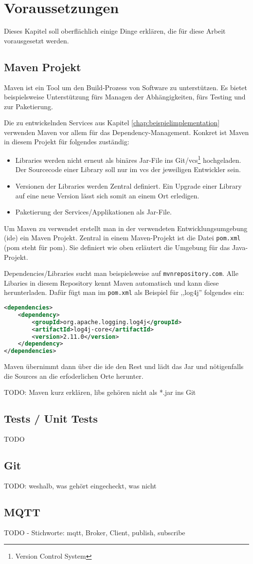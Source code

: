 \chapter{Voraussetzungen}
\label{chap:voraussetzungen}
Dieses Kapitel soll oberflächlich einige Dinge erklären, die für diese Arbeit vorausgesetzt werden.
\section{Maven Projekt}
\label{chap:maven}
Maven ist ein Tool um den Build-Prozess von Software zu unterstützen. Es bietet beispielsweise Unterstützung fürs Managen der Abhängigkeiten, fürs Testing und zur Paketierung.

Die zu entwickelnden Services aus Kapitel \ref{chap:beispielimplementation} verwenden Maven vor allem für das Dependency-Management. Konkret ist Maven in diesem Projekt für folgendes zuständig:
\begin{itemize}
	\item
	Libraries werden nicht erneut als binäres Jar-File ins Git/\acrshort{vcs}\footnote{Version Control System} hochgeladen. Der Sourcecode einer Library soll nur im \acrshort{vcs} der jeweiligen Entwickler sein.
	\item
	Versionen der Libraries werden Zentral definiert. Ein Upgrade einer Library auf eine neue Version lässt sich somit an einem Ort erledigen.
	\item
	Paketierung der Services/Applikationen als Jar-File.
\end{itemize}
Um Maven zu verwendet erstellt man in der verwendeten Entwicklungsumgebung (\acrshort{ide}) ein Maven Projekt. Zentral in einem Maven-Projekt ist die Datei \verb|pom.xml| (\acrshort{pom} steht für \acrlong{pom}). Sie definiert wie oben erläutert die Umgebung für das Java-Projekt.

Dependencies/Libraries sucht man beispielsweise auf \verb|mvnrepository.com|. Alle Libaries in diesem Repository kennt Maven automatisch und kann diese herunterladen. Dafür fügt man im \verb|pom.xml| als Beispiel für ,,log4j'' folgendes ein:
\begin{lstlisting}[language=XML]
<dependencies>
	<dependency>
		<groupId>org.apache.logging.log4j</groupId>
		<artifactId>log4j-core</artifactId>
		<version>2.11.0</version>
	</dependency>
</dependencies>
\end{lstlisting}
Maven übernimmt dann über die \acrshort{ide} den Rest und lädt das Jar und nötigenfalls die Sources an die erfoderlichen Orte herunter.

TODO: Maven kurz erklären, libs gehören nicht als *.jar ins Git
\section{Tests / Unit Tests}
TODO
\section{Git}
TODO: weshalb, was gehört eingecheckt, was nicht
\section{MQTT}
\label{sec:mqtt}
TODO - Stichworte: \acrshort{mqtt}, Broker, Client, publish, subscribe
